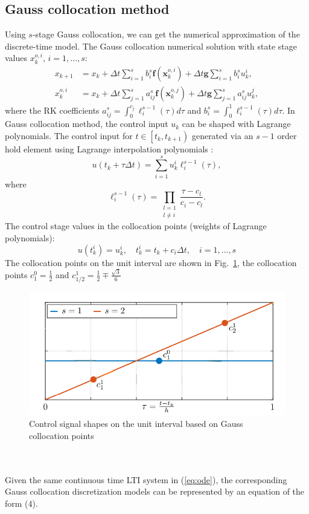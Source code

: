 \subsection{Gauss collocation method}
Using $s$-stage Gauss collocation, we can get the numerical approximation of the discrete-time model. 
The Gauss collocation numerical solution with state stage values $x_{k}^{o, i}$, $i = 1,...,s$:
\begin{equation}
	\begin{split}
		{x}_{k+1} &={x}_{k}+ \Delta t \sum_{i=1}^{s} b_{i}^{s} \mathbf{f}\left(\mathbf{x}_{k}^{o, i}\right)+\Delta t \mathbf{g} \sum_{i=1}^{s} b_{i}^{s} u_{k}^{i} ,\\ {x}_{k}^{o, i} &={x}_{k}+\Delta t \sum_{j=1}^{s} a_{i j}^{s} \mathbf{f}\left(\mathbf{x}_{k}^{o, j}\right)+\Delta t \mathbf{g} \sum_{j=1}^{s} a_{i j}^{s} u_{k}^{j} ,
	\end{split}
\end{equation}
where the RK coefficients $a_{i j}^{s} =\int_{0}^{c_{j}} \ell_{i}^{s-1}(\tau) d \tau$ and $b_{i}^{s} =\int_{0}^{1} \ell_{i}^{s-1}(\tau) d \tau$.
In Gauss collocation method, the control input $u_k$ can be shaped with Lagrange polynomials. The control input for $t \in\left[t_{k}, t_{k+1}\right)$ generated via an $s-1$ order hold element using Lagrange interpolation polynomials \cite{kotyczka2021high}:
\begin{equation}
	u\left(t_{k}+\tau \Delta t\right)=\sum_{i=1}^{s} u_{k}^{i} \ell_{i}^{s-1}(\tau),
\end{equation}
where $$
\ell_{i}^{s-1}(\tau)=\prod_{\substack{l=1 \\ l \neq i}} \frac{\tau-c_{l}}{c_{i}-c_{l}}.
$$
The control stage values in the collocation points (weights of Lagrange polynomials):
$$
u\left(t_{k}^{i}\right)=u_{k}^{i}, \quad t_{k}^{i}=t_{k}+c_{i} \Delta t, \quad i=1, \ldots, s
$$
The collocation points on the unit interval are shown in Fig.~\ref{fig:gausscoll}, the collocation points $c_{1}^{0}=\frac{1}{2}$ and $c_{1 / 2}^{1}=\frac{1}{2} \mp \frac{\sqrt{3}}{6}$
\begin{figure}[h]
	\centering
	\includegraphics[width=\linewidth]{pics/gausscoll.png}
	\caption{Control signal shapes on the unit interval based on Gauss collocation points}
	\label{fig:gausscoll}
\end{figure}
\\\\
Given the same continuous time LTI system in (\ref{eq:ode}), the corresponding Gauss collocation discretization models can be represented by an equation of the form (4).
